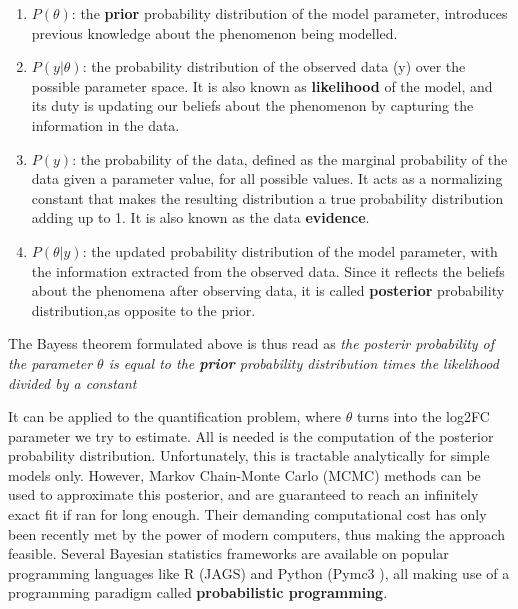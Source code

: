 \documentclass[11pt, a4paper]{report}
\begin{document}
\begin{enumerate}

\item $P(\theta)$: the \textbf{prior} probability distribution of the model parameter, introduces previous knowledge about the phenomenon being modelled.

\item $P(y | \theta)$: the probability distribution of the observed data (y) over the possible parameter space. It is also known as \textbf{likelihood} of the model, and its duty is updating our beliefs about the phenomenon by capturing the information in the data.

\item $P(y)$: the probability of the data, defined as the marginal probability of the data given a parameter value, for all possible values. It acts as a normalizing constant that makes the resulting distribution a true probability distribution adding up to 1. It is also known as the data \textbf{evidence}.

\item $P(\theta | y)$: the updated probability distribution of the model parameter, with the information extracted from the observed data. Since it reflects the beliefs about the phenomena after observing data, it is called \textbf{posterior} probability distribution,as opposite to the prior.

\end{enumerate}


The Bayes\textquotesingle s theorem formulated above is thus read as \textit{the posterir probability of the parameter $\theta$ is equal to the \textbf{prior} probability distribution times the likelihood divided by a constant}

It can be applied to the quantification problem, where $\theta$ turns into the log2FC parameter we try to estimate. All is needed is the computation of the posterior probability distribution. Unfortunately, this is tractable analytically for simple models only. However, Markov Chain-Monte Carlo (\ac{MCMC}) methods can be used to approximate this posterior, and are guaranteed to reach an infinitely exact fit if ran for long enough. Their demanding computational cost has only been recently met by the power of modern computers, thus making the approach feasible. Several Bayesian statistics frameworks are available on popular programming languages like R (JAGS) and Python (Pymc3 \cite{Salvatier2016}), all making use of a programming paradigm called \textbf{probabilistic programming}.
\end{document}
